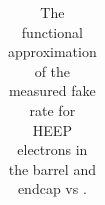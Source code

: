 \begin{table}
\begin{center}
{\begin{tabular}{|c|c|c|c|}
\end{tabular}}
\caption{The functional approximation of the measured fake rate for HEEP electrons in the barrel and endcap vs \et \cite{CMS-AN-2016-404,CMS-AN-2018-021}.}
\label{fr:tab:heepFRV70}

\end{center}
\end{table}

%
%
